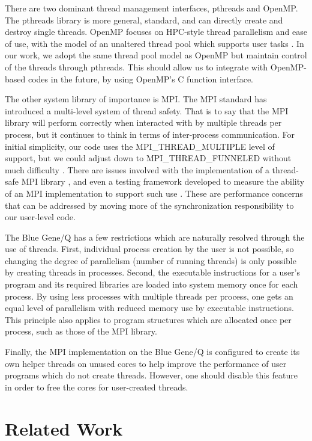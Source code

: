 \documentclass[final,1p,times]{elsarticle}
\begin{document}
There are two dominant thread management interfaces, pthreads and OpenMP.
The pthreads library is more general, standard, and can directly create
and destroy single threads.
OpenMP focuses on HPC-style thread parallelism and ease of use,
with the model of an unaltered thread pool which supports user tasks
\cite{dagum1998openmp}.
In our work, we adopt the same thread pool model as OpenMP but
maintain control of the threads through pthreads.
This should allow us to integrate with OpenMP-based codes
in the future, by using OpenMP's C function interface.

The other system library of importance is MPI.
The MPI standard has introduced a multi-level system of thread safety.
That is to say that the MPI library will perform correctly when
interacted with by multiple threads per process, but it
continues to think in terms of inter-process communication.
For initial simplicity, our code uses the MPI\_THREAD\_MULTIPLE
level of support, but we could adjust down to MPI\_THREAD\_FUNNELED
without much difficulty \cite{balaji2008toward}.
There are issues involved with the implementation of a thread-safe
MPI library \cite{gropp2006issues}, and even a testing framework
developed to measure the ability of an MPI implementation
to support such use \cite{thakur2007test}.
These are performance concerns that can be addressed by moving
more of the synchronization responsibility to our user-level code.

The Blue Gene/Q has a few restrictions which are naturally resolved
through the use of threads.
First, individual process creation by the user is not possible, so
changing the degree of parallelism (number of running threads)
is only possible by creating threads in processes.
Second, the executable instructions for a user's program and its
required libraries are loaded into system memory once for each process.
By using less processes with multiple threads per process, one gets
an equal level of parallelism with reduced memory use by executable
instructions.
This principle also applies to program structures which are allocated
once per process, such as those of the MPI library.

Finally, the MPI implementation on the Blue Gene/Q is configured to
create its own helper threads on unused cores to help improve
the performance of user programs which do not create threads.
However, one should disable this feature in order to free the cores for
user-created threads.

\section{Related Work}
\label{sec:related}
\end{document}
